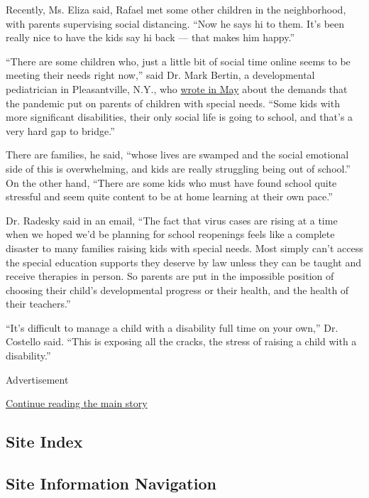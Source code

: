 Recently, Ms. Eliza said, Rafael met some other children in the
neighborhood, with parents supervising social distancing. ``Now he says
hi to them. It's been really nice to have the kids say hi back --- that
makes him happy.''

``There are some children who, just a little bit of social time online
seems to be meeting their needs right now,'' said Dr. Mark Bertin, a
developmental pediatrician in Pleasantville, N.Y., who
\href{https://www.nytimes3xbfgragh.onion/2020/05/13/well/family/coronavirus-shutdowns-children-special-needs-adhd-autism.html?searchResultPosition=1}{wrote
in May} about the demands that the pandemic put on parents of children
with special needs. ``Some kids with more significant disabilities,
their only social life is going to school, and that's a very hard gap to
bridge.''

There are families, he said, ``whose lives are swamped and the social
emotional side of this is overwhelming, and kids are really struggling
being out of school.'' On the other hand, ``There are some kids who must
have found school quite stressful and seem quite content to be at home
learning at their own pace.''

Dr. Radesky said in an email, ``The fact that virus cases are rising at
a time when we hoped we'd be planning for school reopenings feels like a
complete disaster to many families raising kids with special needs. Most
simply can't access the special education supports they deserve by law
unless they can be taught and receive therapies in person. So parents
are put in the impossible position of choosing their child's
developmental progress or their health, and the health of their
teachers.''

``It's difficult to manage a child with a disability full time on your
own,'' Dr. Costello said. ``This is exposing all the cracks, the stress
of raising a child with a disability.''

Advertisement

\protect\hyperlink{after-bottom}{Continue reading the main story}

\hypertarget{site-index}{%
\subsection{Site Index}\label{site-index}}

\hypertarget{site-information-navigation}{%
\subsection{Site Information
Navigation}\label{site-information-navigation}}

